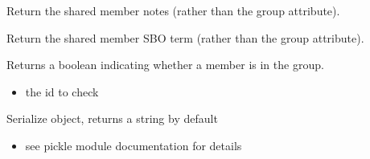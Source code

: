 \documentclass[letterpaper,10pt,english]{sphinxmanual}
\begin{document}
\begin{fulllineitems}
\begin{fulllineitems}
\label{\detokenize{modules_doc:cbmpy.CBModel.Group.getSharedNotes}}
\pysigstartsignatures
{}
\pysigstopsignatures
\sphinxAtStartPar
Return the shared member notes (rather than the group attribute).

\end{fulllineitems}


\begin{fulllineitems}
\label{\detokenize{modules_doc:cbmpy.CBModel.Group.getSharedSBOterm}}
\pysigstartsignatures
{}
\pysigstopsignatures
\sphinxAtStartPar
Return the shared member SBO term (rather than the group attribute).

\end{fulllineitems}


\begin{fulllineitems}
\label{\detokenize{modules_doc:cbmpy.CBModel.Group.hasMember}}
\pysigstartsignatures
{}
\pysigstopsignatures
\sphinxAtStartPar
Returns a boolean indicating whether a member is in the group.
\begin{itemize}
\item {} 
\sphinxAtStartPar
{} the id to check

\end{itemize}

\end{fulllineitems}


\begin{fulllineitems}
\label{\detokenize{modules_doc:cbmpy.CBModel.Group.serialize}}
\pysigstartsignatures
{}
\pysigstopsignatures
\sphinxAtStartPar
Serialize object, returns a string by default
\begin{itemize}
\item {} \begin{description}
\sphinxAtStartPar
see pickle module documentation for details


\end{description}
\end{itemize}
\end{fulllineitems}
\end{fulllineitems}
\end{document}
